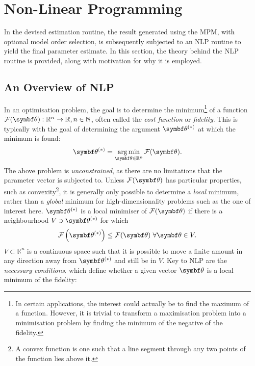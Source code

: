 \section{Non-Linear Programming}
\label{sec:nlp}
In the devised estimation routine, the result generated using the \ac{MPM},
with optional model order selection, is subsequently subjected to an \ac{NLP}
routine to yield the final parameter estimate. In this section, the theory
behind the \ac{NLP} routine is provided, along with motivation for why it
is employed.

\subsection{An Overview of \ac{NLP}}
\label{subsec:nlp-overview}
In an optimisation problem, the goal is to determine the minimum\footnote{
    In certain applications, the interest could actually be to find the maximum of
    a function. However, it is trivial to transform a maximisation problem into
    a minimisation problem by finding the minimum of the negative of the fidelity.
}
of a function $\Fth: \mathbb{R}^n \rightarrow \mathbb{R}, n \in \mathbb{N}$, often
called the \emph{cost function} or \emph{fidelity}.
This is typically with the goal of determining the argument $\bthstar$ at
which the minimum is found:
\begin{equation}
    \bthstar = \argmin_{\bth \in \mathbb{R}^n} \Fth.
    \label{eq:minF}
\end{equation}
The above problem is \emph{unconstrained}, as there are no limitations that the
parameter vector is subjected to. Unless $\Fth$ has particular properties, such
as convexity\footnote{
    A convex function is one such that a line segment through any two points of
    the function lies above it.
}, it is generally only possible to determine a \emph{local} minimum,
rather than a \emph{global} minimum for high-dimensionality problems such as
the one of interest here. $\bthstar$ is a local
minimiser of $\Fth$ if there is a neighbourhood $V \ni \bthstar$ for which
\begin{equation}
    \Fthstar \leq \Fth\ \forall \bth \in V.
  \label{def:local-minimiser}
\end{equation}
$V \subset \mathbb{R}^n$ is a continuous space such that it is possible to move
a finite amount in any direction away from $\bthstar$ and still be in $V$.
Key to \ac{NLP} are the \emph{necessary conditions}, which define whether a
given vector $\bth$ is a local minimum of the fidelity:
